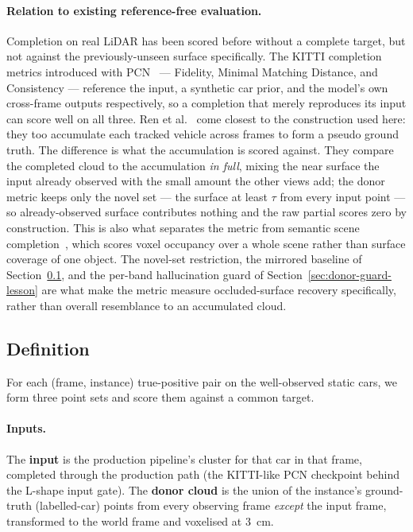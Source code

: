 \paragraph{Relation to existing reference-free evaluation.} Completion on real LiDAR has
been scored before without a complete target, but not against the previously-unseen
surface specifically. The KITTI completion metrics introduced with
PCN~\cite{yuan2019pcnpointcompletionnetwork} --- Fidelity, Minimal Matching Distance, and
Consistency --- reference the input, a synthetic car prior, and the model's own cross-frame
outputs respectively, so a completion that merely reproduces its input can score well on
all three. Ren et al.~\cite{ren2022selfsupervised} come closest to the construction used
here: they too accumulate each tracked vehicle across frames to form a pseudo ground truth.
The difference is what the accumulation is scored against. They compare the completed cloud
to the accumulation \emph{in full}, mixing the near surface the input already observed with
the small amount the other views add; the donor metric keeps only the novel set --- the
surface at least $\tau$ from every input point --- so already-observed surface contributes
nothing and the raw partial scores zero by construction. This is also what separates the
metric from semantic scene completion~\cite{Behley_2019_ICCV}, which scores voxel occupancy
over a whole scene rather than surface coverage of one object. The novel-set restriction,
the mirrored baseline of Section~\ref{sec:donor-definition}, and the per-band hallucination
guard of Section~\ref{sec:donor-guard-lesson} are what make the metric measure
occluded-surface recovery specifically, rather than overall resemblance to an accumulated
cloud.

\subsection{Definition}
\label{sec:donor-definition}

For each (frame, instance) true-positive pair on the well-observed static cars,
we form three point sets and score them against a common target.

\paragraph{Inputs.} The \textbf{input} is the production pipeline's cluster for
that car in that frame, completed through the production path (the KITTI-like
PCN checkpoint behind the L-shape input gate). The \textbf{donor cloud} is the
union of the instance's ground-truth (labelled-car) points from every observing
frame \emph{except} the input frame, transformed to the world frame and
voxelised at \SI{3}{\centi\meter}.

